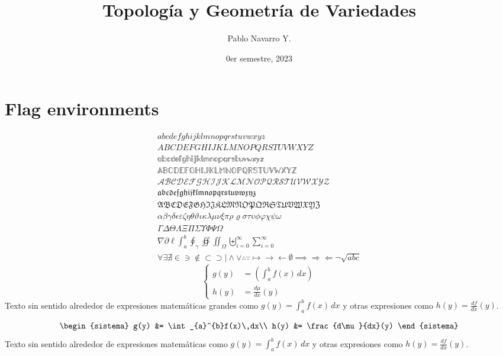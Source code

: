 \documentclass[toc,todo]{apuntes}
\title{Topología y Geometría de Variedades}
\author{Pablo Navarro Y.}
\date{0er semestre, 2023}
\begin{document}
\renewcommand{\onlyinsubfile}[1]{}
\renewcommand{\notinsubfile}[1]{#1}
\maketitle

\section{Flag environments}
\begin{align}
  a b c d e f g h i j k l m n o p q r s t u v w x y z \\
  A B C D E F G H I J K L M N O P Q R S T U V W X Y Z \\
  \mathbb{a b c d e f g h i j k l m n o p q r s t u v w x y z} \\
  \mathbb{A B C D E F G H I J K L M N O P Q R S T U V W X Y Z} \\
  \mathcal{A B C D E F G H I J K L M N O P Q R S T U V W X Y Z} \\
  \mathfrak{a b c d e f g h i j k l m n o p q r s t u v w x y z} \\
  \mathfrak{A B C D E F G H I J K L M N O P Q R S T U V W X Y Z} \\
  \alpha \beta \gamma \delta \epsilon \varepsilon \zeta \eta \theta \vartheta \iota \kappa \lambda \mu \nu \xi \pi \rho \varrho \sigma \tau \upsilon \phi \varphi \chi \psi \omega \\
  \Gamma \Delta \Theta \Lambda \Xi \Pi \Sigma \Upsilon \Phi \Psi \Omega \\
  \nabla \partial \ell \int_{a}^{b} \oint_{\gamma} \oiint  \iint_{\Omega} \biguplus_{i=0}^{\infty} \sum_{i=0}^{\infty}\\
  \forall \exists \nexists \in \ni \notin \subset \supset \mid \wedge \vee \therefore \because \mapsto \to \gets \emptyset \implies \Rightarrow \Leftarrow \neg
  \sqrt{abc}
\end{align}
\begin{equation}
  \left\lbrace
	\begin{aligned}
	  g(y) &= \left( \int_{a}^{b}f(x)\,dx \right)\\
	  h(y) &= \frac{d\mu}{dx}(y)
	\end{aligned}
  \right.
\end{equation}
Texto sin sentido alrededor de expresiones matemáticas grandes como \(g(y) = \int_{a}^{b}f(x)\,dx\) y otras expresiones como \(h(y) = \frac{df}{dx}(y)\).

\begin{definicion}[][reff]
	\begin{equation}
		\begin{sistema}
			g(y) &= \int_{a}^{b}f(x)\,dx\\
			h(y) &= \frac{d\mu}{dx}(y)
		\end{sistema}
	\end{equation}
	Texto sin sentido alrededor de expresiones matemáticas como \(g(y) = \int_{a}^{b}f(x)\,dx\) y otras expresiones como \(h(y) = \frac{df}{dx}(y)\).
	\lipsum[1]
\end{definicion}
\end{document}
